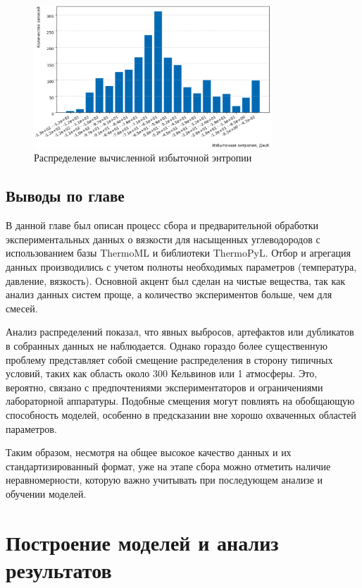 \documentclass[a4paper,12pt]{article}
\begin{document}
      \begin{figure}[ht!]
          \centering
          \includegraphics[width=0.8\textwidth]{data_distribution_excess_entropy.png}
          \caption{Распределение вычисленной избыточной энтропии}
          \label{fig:data_distribution_excess_entropy}
      \end{figure}
      
  \subsection{Выводы по главе}
    В данной главе был описан процесс сбора и предварительной обработки экспериментальных данных о вязкости для насыщенных углеводородов с использованием базы ThermoML и библиотеки ThermoPyL. Отбор и агрегация данных производились с учетом полноты необходимых параметров (температура, давление, вязкость). Основной акцент был сделан на чистые вещества, так как анализ данных систем проще, а количество экспериментов больше, чем для смесей.

    Анализ распределений показал, что явных выбросов, артефактов или дубликатов в собранных данных не наблюдается. Однако гораздо более существенную проблему представляет собой смещение распределения в сторону типичных условий, таких как область около 300 Кельвинов или 1 атмосферы. Это, вероятно, связано с предпочтениями экспериментаторов и ограничениями лабораторной аппаратуры. Подобные смещения могут повлиять на обобщающую способность моделей, особенно в предсказании вне хорошо охваченных областей параметров.

    Таким образом, несмотря на общее высокое качество данных и их стандартизированный формат, уже на этапе сбора можно отметить наличие неравномерности, которую важно учитывать при последующем анализе и обучении моделей.
\newpage

\section{Построение моделей и анализ результатов}
\end{document}
